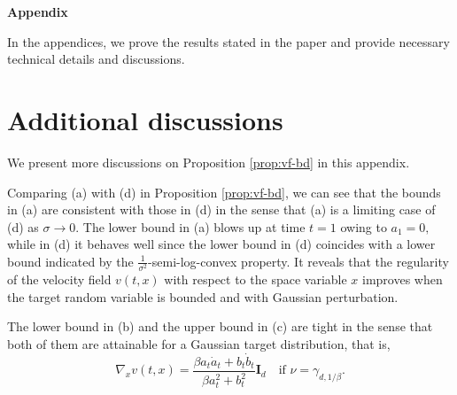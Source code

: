 \documentclass[twoside,11pt]{article}
\def\rmI{{\mathbf{I}}}
\numberwithin{equation}{section}
\begin{document}



\newpage

\appendix
\noindent
\textbf{\large Appendix}

\medskip\noindent
{\color{black}
In the appendices, we prove the results stated in the paper and provide necessary technical details and discussions.

\iffalse
\section{Additional discussions}
We present more discussions on Proposition \ref{prop:vf-bd} in this appendix.

\begin{remark}
Comparing (a) with (d) in Proposition \ref{prop:vf-bd}, we
can see that the bounds in (a) are consistent with those in (d) in the sense that (a) is a limiting case of (d) as $\sigma \to 0$. The lower bound in (a) blows up at time $t = 1$ owing to $a_1 = 0,$ while in (d) it behaves well since the lower bound in (d) coincides with a lower bound indicated by the $\tfrac{1}{\sigma^2}$-semi-log-convex property. It reveals that the regularity of the velocity field $v(t, x)$
with respect to the space variable $x$
improves when the target random variable is bounded and with Gaussian perturbation.
\end{remark}

\begin{remark}
The lower bound in (b) and the upper bound in (c) are tight in the sense that both of them are attainable for a
Gaussian target distribution, that is,
\begin{equation*}
    \nabla_x v(t, x) = \frac{\beta a_t \dot{a}_t + b_t \dot{b}_t} {\beta a_t^2 + b_t^2} \rmI_d \quad \text{if $\nu = \gamma_{d, 1/\beta}$.}
\end{equation*}
\end{remark}

}
\end{document}
